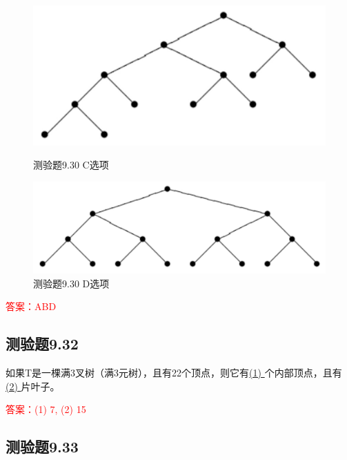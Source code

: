 \documentclass[UTF8, heading=true]{ctexart}
\begin{document}
\begin{figure}[H]
  \centering
  \begin{minipage}[t]{0.29\textwidth}
      \centering
      \includegraphics[width=1\textwidth]{9.30_3.jpg} %
      \vspace{-0.3cm}
      \caption{测验题9.30 C选项}
  \end{minipage}
  \hspace{0.2\textwidth} %
  \begin{minipage}[t]{0.34\textwidth}
      \centering
      \includegraphics[width=1\textwidth]{9.30_4.jpg} %
      \vspace{-0.3cm}
      \caption{测验题9.30 D选项}
\end{minipage}
\end{figure}

\textcolor{red}{答案：ABD}

\subsection{测验题9.32}

如果T是一棵满3叉树（满3元树），且有22个顶点，则它有\underline{\quad (1) \quad}个内部顶点，且有
\underline{\quad (2) \quad}片叶子。

\textcolor{red}{答案：(1) 7, (2) 15}

\subsection{测验题9.33}
\end{document}
